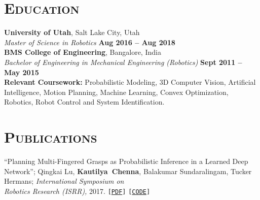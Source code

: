 \documentclass[margin, line]{resume}
\begin{document}
\begin{resume}
    \section{\mysidestyle \textsc{Education}}
    \textbf{University of Utah}, Salt Lake City, Utah %
    \\\vspace{1mm}%
    \textsl{Master of Science in Robotics} \hfill \textbf{ Aug 2016 -- Aug 2018}\\%
    \textbf{BMS College of Engineering}, Bangalore, India %
    \\\vspace{1mm}%
    \textsl{Bachelor of Engineering in Mechanical Engineering (Robotics)} \hfill \textbf{Sept 2011 -- May 2015}\\%
    \textbf{Relevant Coursework:} Probabilistic Modeling, 3D Computer Vision, Artificial Intelligence, Motion Planning, Machine Learning, Convex Optimization, Robotics, Robot Control and System Identification.



    \sectionline
    \section{\mysidestyle \textsc{Publications}}
     ``Planning Multi-Fingered Grasps as Probabilistic Inference in a Learned Deep Network''; Qingkai Lu,
     \mbox{\bf Kautilya Chenna}, Balakumar Sundaralingam, Tucker Hermans; \textit{International Symposium on\\ Robotics Research (ISRR),} 2017. \texttt{[\href{http://www.cs.utah.edu/~thermans/papers/lu-isrr2017-deep-multifinger-grasping.pdf}{PDF}]} \texttt{[\href{https://robot-learning.cs.utah.edu/project/grasp\_inference}{CODE}]}%



\end{resume}
\end{document}
